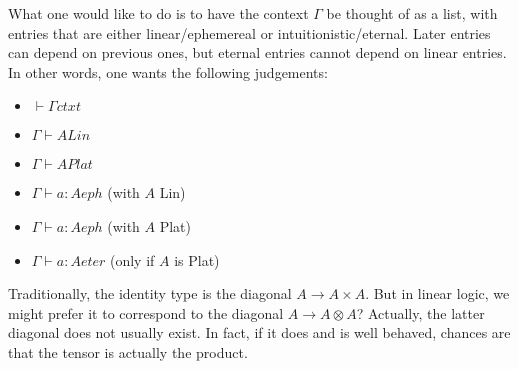 What one would like to do is to have the context $\Gamma$ be thought of as a list, with entries that are either linear/ephemereal or intuitionistic/eternal. Later entries can depend on previous ones, but eternal entries cannot depend on linear entries. In other words, one wants the following judgements:
\begin{itemize}
\item $\vdash \Gamma ctxt$
\item $\Gamma \vdash A Lin$
\item $\Gamma \vdash A Plat$
\item $\Gamma \vdash a : A eph$ (with $A$ Lin)
\item $\Gamma \vdash a : A eph$ (with $A$ Plat)
\item $\Gamma \vdash a : A eter$ (only if $A$ is Plat)
\end{itemize}
Traditionally, the identity type is the diagonal $A \to A \times A$. But in linear logic, we might prefer it to correspond to the diagonal $A \to A \otimes A$? Actually, the latter diagonal does not usually exist. In fact, if it does and is well behaved, chances are that the tensor is actually the product.

